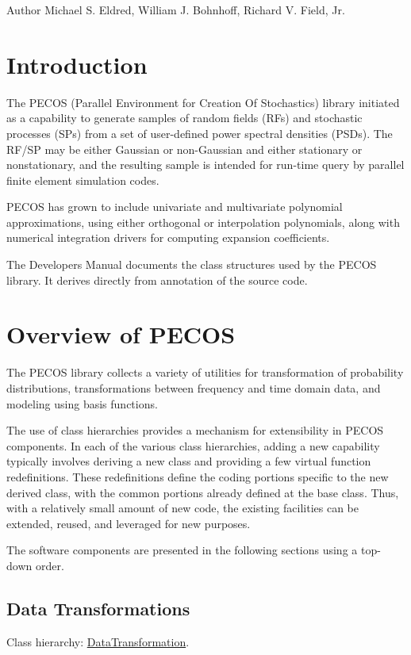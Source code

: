\begin{DoxyAuthor}{Author}
Michael S. Eldred, William J. Bohnhoff, Richard V. Field, Jr.
\end{DoxyAuthor}
\hypertarget{index_DevIntro}{}\section{Introduction}\label{index_DevIntro}
The P\+E\+C\+OS (Parallel Environment for Creation Of Stochastics) library initiated as a capability to generate samples of random fields (R\+Fs) and stochastic processes (S\+Ps) from a set of user-\/defined power spectral densities (P\+S\+Ds). The R\+F/\+SP may be either Gaussian or non-\/\+Gaussian and either stationary or nonstationary, and the resulting sample is intended for run-\/time query by parallel finite element simulation codes.

P\+E\+C\+OS has grown to include univariate and multivariate polynomial approximations, using either orthogonal or interpolation polynomials, along with numerical integration drivers for computing expansion coefficients.

The Developers Manual documents the class structures used by the P\+E\+C\+OS library. It derives directly from annotation of the source code.\hypertarget{index_DevOverview}{}\section{Overview of P\+E\+C\+OS}\label{index_DevOverview}
The P\+E\+C\+OS library collects a variety of utilities for transformation of probability distributions, transformations between frequency and time domain data, and modeling using basis functions.

The use of class hierarchies provides a mechanism for extensibility in P\+E\+C\+OS components. In each of the various class hierarchies, adding a new capability typically involves deriving a new class and providing a few virtual function redefinitions. These redefinitions define the coding portions specific to the new derived class, with the common portions already defined at the base class. Thus, with a relatively small amount of new code, the existing facilities can be extended, reused, and leveraged for new purposes.

The software components are presented in the following sections using a top-\/down order.\hypertarget{index_DevDataTrans}{}\subsection{Data Transformations}\label{index_DevDataTrans}
Class hierarchy\+: \hyperlink{classPecos_1_1DataTransformation}{Data\+Transformation}.

